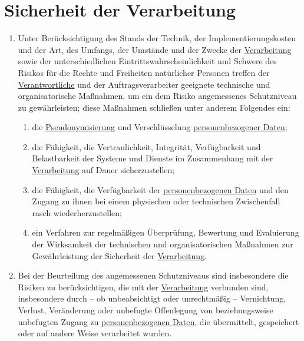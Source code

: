 \chapter{Sicherheit der Verarbeitung}
\label{ch:32}


\begin{enumerate}

  \item Unter Berücksichtigung des Stands der Technik, der Implementierungskosten und der Art, des Umfangs, der Umstände
   und der Zwecke der \hyperref[itm:04-2]{Verarbeitung} sowie der unterschiedlichen Eintrittswahrscheinlichkeit und Schwere des Risikos für
   die Rechte und Freiheiten natürlicher Personen treffen der \hyperref[itm:04-7]{Verantwortliche} und der Auftragsverarbeiter geeignete
   technische und organisatorische Maßnahmen, um ein dem Risiko angemessenes Schutzniveau zu gewährleisten; diese
   Maßnahmen schließen unter anderem Folgendes ein:
  \label{itm:32-1}

  \begin{enumerate}
  
    \item die \hyperref[itm:04-5]{Pseudonymisierung} und Verschlüsselung \hyperref[itm:04-1]{personenbezogener Daten};
    \label{itm:32-1a}

    \item die Fähigkeit, die Vertraulichkeit, Integrität, Verfügbarkeit und Belastbarkeit der Systeme und Dienste im
     Zusammenhang mit der \hyperref[itm:04-2]{Verarbeitung} auf Dauer sicherzustellen;
    \label{itm:32-1b}

    \item die Fähigkeit, die Verfügbarkeit der \hyperref[itm:04-1]{personenbezogenen Daten} und den Zugang zu ihnen bei einem physischen oder
     technischen Zwischenfall rasch wiederherzustellen;
    \label{itm:32-1c}

    \item ein Verfahren zur regelmäßigen Überprüfung, Bewertung und Evaluierung der Wirksamkeit der technischen und
     organisatorischen Maßnahmen zur Gewährleistung der Sicherheit der \hyperref[itm:04-2]{Verarbeitung}.
    \label{itm:32-1d}

  \end{enumerate}

  \item Bei der Beurteilung des angemessenen Schutzniveaus sind insbesondere die Risiken zu berücksichtigen, die mit der
   \hyperref[itm:04-2]{Verarbeitung} verbunden sind, insbesondere durch -- ob unbeabsichtigt oder unrechtmäßig -- Vernichtung, Verlust,
   Veränderung oder unbefugte Offenlegung von beziehungsweise unbefugten Zugang zu \hyperref[itm:04-1]{personenbezogenen Daten}, die
   übermittelt, gespeichert oder auf andere Weise verarbeitet wurden.
  \label{itm:32-2}


\end{enumerate}
